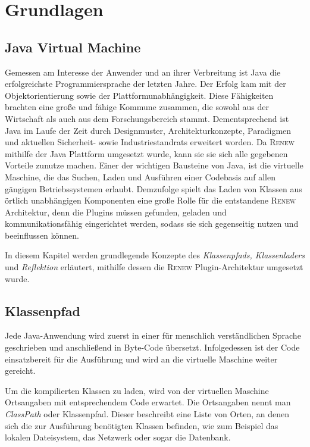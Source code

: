 \chapter{Grundlagen} \label{cha:Grundlagen}

\section{Java Virtual Machine} \label{sec:JVM}

  Gemessen am Interesse der Anwender und an ihrer Verbreitung ist Java die erfolgreichste Programmiersprache der letzten Jahre. Der Erfolg kam mit der Objektorientierung sowie der Plattformunabhängigkeit. Diese Fähigkeiten brachten eine große und fähige Kommune zusammen, die sowohl aus der Wirtschaft als auch aus dem Forschungsbereich stammt. Dementsprechend ist Java im Laufe der Zeit durch Designmuster, Architekturkonzepte, Paradigmen und aktuellen Sicherheit- sowie Industriestandrats erweitert worden. Da \textsc{Renew} mithilfe der Java Plattform umgesetzt wurde, kann sie sie sich alle gegebenen Vorteile zunutze machen. \newline
  Einer der wichtigen Bausteine von Java, ist die virtuelle Maschine, die das Suchen, Laden und Ausführen einer Codebasis auf allen gängigen Betriebssystemen erlaubt. Demzufolge spielt das Laden von Klassen aus örtlich unabhängigen Komponenten eine große Rolle für die entstandene \textsc{Renew} Architektur, denn die Plugins müssen gefunden, geladen und kommunikationsfähig eingerichtet werden, sodass sie sich gegenseitig nutzen und beeinflussen können.\bigbreak

  In diesem Kapitel werden grundlegende Konzepte des \textit{ Klassenpfads, Klassenladers} und \textit{Reflektion} erläutert, mithilfe dessen die \textsc{Renew} Plugin-Architektur umgesetzt wurde.


\section{Klassenpfad} \label{sec:K}

  Jede Java-Anwendung wird zuerst in einer für menschlich verständlichen Sprache geschrieben und anschließend in Byte-Code übersetzt. Infolgedessen ist der Code einsatzbereit für die Ausführung und wird an die virtuelle Maschine weiter gereicht.

  Um die kompilierten Klassen zu laden, wird von der virtuellen Maschine Ortsangaben mit entsprechendem Code erwartet. Die Ortsangaben nennt man \textit{ClassPath} oder Klassenpfad. Dieser beschreibt eine Liste von Orten, an denen sich die zur Ausführung benötigten Klassen befinden, wie zum Beispiel das lokalen Dateisystem, das Netzwerk oder sogar die Datenbank. 

